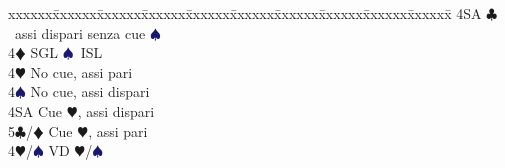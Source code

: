 \documentclass[a4paper,italian]{article}
\newcommand{\BC}{\textcolor{OliveGreen}{$\clubsuit$}}
\newcommand{\BD}{\textcolor{RedOrange}{$\vardiamondsuit$}}
\newcommand{\BH}{\textcolor{Red2}{$\varheartsuit${}}}
\newcommand{\BS}{\textcolor{MidnightBlue}{$\spadesuit${}}}
\newenvironment{bidtable}
{\begin{tabbing}

    xxxxxx\=xxxxxx\=xxxxxx\=xxxxxx\=xxxxxx\=xxxxxx\=xxxxxx\=xxxxxx\=xxxxxx\=xxxxxx\=\kill}
{\end{tabbing} }%
\begin{document}
\begin{multicols}{2}
\begin{bidtable}
                                            4SA \> \BC\ assi dispari senza cue \BS \-\\
                                            4\BD \> SGL \BS\ ISL\+\\
                                            4\BH \> No cue, assi pari\\
                                            4\BS \> No cue, assi dispari\\
                                            4SA \> Cue \BH, assi dispari\\
                                            5\BC/\BD \> Cue \BH, assi pari\-\\
                                            4\BH/\BS \> VD \BH /\BS
                                        \end{bidtable}
                                    \end{multicols}
                                    \newpage
\end{document}
